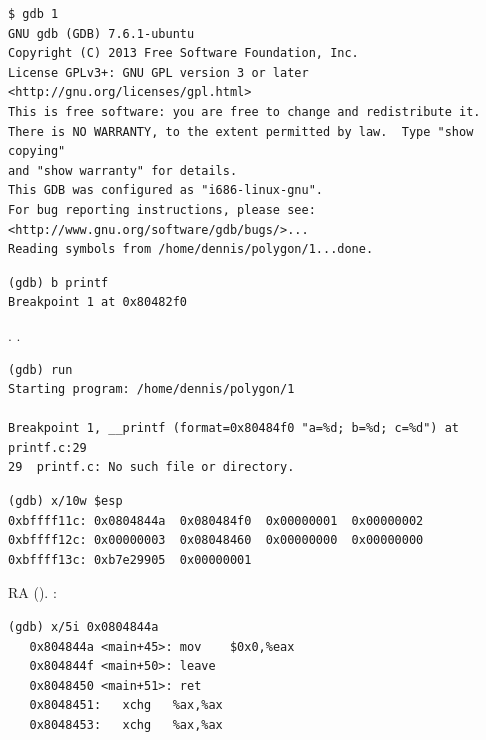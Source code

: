 \begin{lstlisting}
$ gdb 1
GNU gdb (GDB) 7.6.1-ubuntu
Copyright (C) 2013 Free Software Foundation, Inc.
License GPLv3+: GNU GPL version 3 or later <http://gnu.org/licenses/gpl.html>
This is free software: you are free to change and redistribute it.
There is NO WARRANTY, to the extent permitted by law.  Type "show copying"
and "show warranty" for details.
This GDB was configured as "i686-linux-gnu".
For bug reporting instructions, please see:
<http://www.gnu.org/software/gdb/bugs/>...
Reading symbols from /home/dennis/polygon/1...done.
\end{lstlisting}

\begin{lstlisting}[caption=\RU{установим точку останова на}\EN{let's set breakpoint on} \printf]
(gdb) b printf
Breakpoint 1 at 0x80482f0
\end{lstlisting}

.
 \printf%
.

\begin{lstlisting}
(gdb) run
Starting program: /home/dennis/polygon/1 

Breakpoint 1, __printf (format=0x80484f0 "a=%d; b=%d; c=%d") at printf.c:29
29	printf.c: No such file or directory.
\end{lstlisting}


\begin{lstlisting}
(gdb) x/10w $esp
0xbffff11c:	0x0804844a	0x080484f0	0x00000001	0x00000002
0xbffff12c:	0x00000003	0x08048460	0x00000000	0x00000000
0xbffff13c:	0xb7e29905	0x00000001
\end{lstlisting}

 \ac{RA} ().
:

\begin{lstlisting}
(gdb) x/5i 0x0804844a
   0x804844a <main+45>:	mov    $0x0,%eax
   0x804844f <main+50>:	leave  
   0x8048450 <main+51>:	ret    
   0x8048451:	xchg   %ax,%ax
   0x8048453:	xchg   %ax,%ax
\end{lstlisting}

